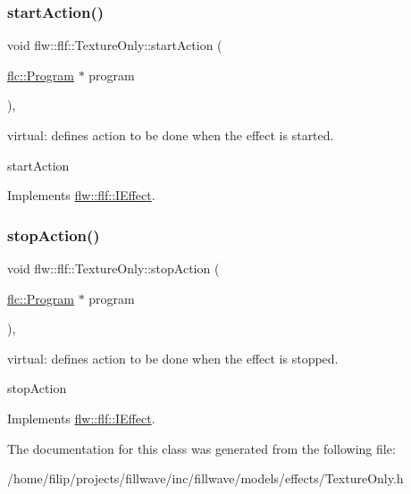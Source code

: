 \subsubsection{\texorpdfstring{start\+Action()}{startAction()}}
{\footnotesize\ttfamily void flw\+::flf\+::\+Texture\+Only\+::start\+Action (\begin{DoxyParamCaption}\item[{\hyperlink{classflw_1_1flc_1_1Program}{flc\+::\+Program} $\ast$}]{program }\end{DoxyParamCaption})\hspace{0.3cm}{\ttfamily [override]}, {\ttfamily [virtual]}}



virtual\+: defines action to be done when the effect is started. 

start\+Action 

Implements \hyperlink{classflw_1_1flf_1_1IEffect_afc7cec9080d135ed264b08a90c7b94e9}{flw\+::flf\+::\+I\+Effect}.

\mbox{\label{classflw_1_1flf_1_1TextureOnly_ae23d8e028389fd4894135247574f976b}} 
\subsubsection{\texorpdfstring{stop\+Action()}{stopAction()}}
{\footnotesize\ttfamily void flw\+::flf\+::\+Texture\+Only\+::stop\+Action (\begin{DoxyParamCaption}\item[{\hyperlink{classflw_1_1flc_1_1Program}{flc\+::\+Program} $\ast$}]{program }\end{DoxyParamCaption})\hspace{0.3cm}{\ttfamily [override]}, {\ttfamily [virtual]}}



virtual\+: defines action to be done when the effect is stopped. 

stop\+Action 

Implements \hyperlink{classflw_1_1flf_1_1IEffect_a1a03eaf63a9d4edbd8764540d2d4133c}{flw\+::flf\+::\+I\+Effect}.



The documentation for this class was generated from the following file\+:\begin{DoxyCompactItemize}
\item 
/home/filip/projects/fillwave/inc/fillwave/models/effects/Texture\+Only.\+h\end{DoxyCompactItemize}
